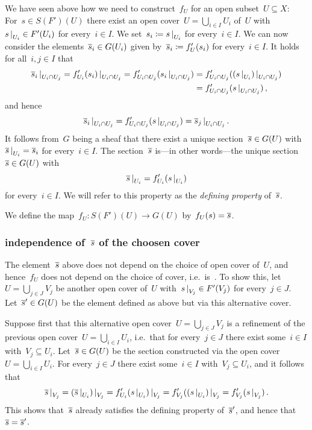 We have seen above how we need to construct~$f_U$ for an open subset~$U \subseteq X$:
For~$s \in S(F')(U)$ there exist an open cover~$U = \bigcup_{i \in I} U_i$ of~$U$ with~$\restrict{s}{U_i} \in F'(U_i)$ for every~$i \in I$.
We set~$s_i \defined \restrict{s}{U_i}$ for every~$i \in I$.
We can now consider the elements~$\overline{s}_i \in G(U_i)$ given by~$\overline{s}_i \coloneqq f'_U(s_i)$ for every~$i \in I$.
It holds for all~$i,j \in I$ that
\begin{align*}
      \restrict{\induced{s}_i}{U_i \cap U_j}
   =  \restrict{f'_{U_i}(s_i)}{U_i \cap U_j}
   =  f'_{U_i \cap U_j}(\restrict{s_i}{U_i \cap U_j})
  &=  f'_{U_i \cap U_j}(\restrict{(\restrict{s}{U_i})}{U_i \cap U_j}) \\
  &=  f'_{U_i \cap U_j}(\restrict{s}{U_i \cap U_j}) \,,
\end{align*}
and hence
\[
    \restrict{\induced{s}_i}{U_i \cap U_j}
  = f'_{U_i \cap U_j}(\restrict{s}{U_i \cap U_j})
  = \restrict{\induced{s}_j}{U_i \cap U_j} \,.
\]
It follows from~$G$ being a sheaf that there exist a unique section~$\overline{s} \in G(U)$ with~$\restrict{\induced{s}}{U_i} = \induced{s}_i$ for every~$i \in I$.
The section~$\overline{s}$ is---in other words---the unique section~$\overline{s} \in G(U)$ with
\[
    \restrict{\induced{s}}{U_i}
  = f'_{U_i}(\restrict{s}{U_i})
\]
for every~$i \in I$.
We will refer to this property as the \emph{defining property} of~$\overline{s}$.

We define the map~$f_U \colon S(F')(U) \to G(U)$ by~$f_U(s) = \overline{s}$.



\subsubsection*{independence of~$\overline{s}$ of the choosen cover}

The element~$\overline{s}$ above does not depend on the choice of open cover of~$U$, and hence~$f_U$ does not depend on the choice of cover, i.e.\ is~{\welldef}.
To show this, let~$U = \bigcup_{j \in J} V_j$ be another open cover of~$U$ with~$\restrict{s}{V_j} \in F'(V_j)$ for every~$j \in J$.
Let~$\overline{s}' \in G(U)$ be the element defined as above but via this alternative cover.

Suppose first that this alternative open cover~$U = \bigcup_{j \in J} V_j$ is a refinement of the previous open cover~$U = \bigcup_{i \in I} U_i$, i.e.\ that for every~$j \in J$ there exist some~$i \in I$ with~$V_j \subseteq U_i$.
Let~$\overline{s} \in G(U)$ be the section constructed via the open cover~$U = \bigcup_{i \in I} U_i$.
For every~$j \in J$ there exist some~$i \in I$ with~$V_j \subseteq U_i$, and it follows that
\[
    \restrict{ \induced{s} }{V_j}
  = \restrict{ (\restrict{\induced{s}}{U_i}) }{V_j}
  = \restrict{ f'_{U_i}(\restrict{s}{U_i}) }{V_j}
  = f'_{V_j}( \restrict{ (\restrict{s}{U_i}) }{V_j}
  = f'_{V_j}( \restrict{ s }{V_j} ) \,.
\]
This shows that~$\overline{s}$ already satisfies the defining property of~$\overline{s}'$, and hence that~$\overline{s} = \overline{s}'$.

